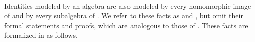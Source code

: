 \begin{code}
\AgdaSymbol{(}\AgdaSpace{}%
\AgdaSpace{}%
\AgdaSymbol{)}%
\>[70]\<%
\\
%
\>[6]\AgdaSpace{}%
\AgdaSpace{}%
%
\>[14]%
\>[32]%
\>[37]\<%
\\
\>[1][@{}l@{\AgdaIndent{0}}]%
\>[2]\<%
\\
%
\>[2]\AgdaSpace{}%
\AgdaSpace{}%
\AgdaSymbol{=}\AgdaSpace{}%
\AgdaSpace{}%
\AgdaSpace{}%
\AgdaSpace{}%
\AgdaSpace{}%
\AgdaSymbol{;}\AgdaSpace{}%
\AgdaSpace{}%
\AgdaSymbol{=}\AgdaSpace{}%
\AgdaSpace{}%
\AgdaSpace{}%
\AgdaSpace{}%
\<%
\\
%
\>[2]\AgdaSpace{}%
\AgdaSpace{}%
\AgdaSpace{}%
\AgdaSpace{}%
\AgdaSymbol{()}\AgdaSpace{}%
\AgdaSpace{}%
\AgdaSymbol{(}\AgdaSpace{}%
\AgdaSpace{}%
\AgdaSpace{}%
\AgdaSpace{}%
\AgdaSymbol{)}\AgdaSpace{}%
\AgdaSymbol{;}\AgdaSpace{}%
\AgdaSpace{}%
\AgdaSpace{}%
\AgdaSpace{}%
\AgdaSpace{}%
\AgdaSymbol{(}\AgdaSpace{}%
\AgdaSpace{}%
\AgdaSymbol{)}\<%
\\
%
\>[2]\AgdaSpace{}%
\AgdaSpace{}%
\AgdaOperator{\AgdaFunction{𝔻[}}\AgdaSpace{}%
\AgdaSpace{}%
\AgdaOperator{\AgdaFunction{]}}\<%
\\
\>[0]\<%
\end{code}
Identities modeled by an algebra  are also modeled by every homomorphic image of
 and by every subalgebra of .
\ifshort
We refer to these facts as  and , but omit their formal
statements and proofs, which are analogous to those of .
\else
These facts are formalized in \agda as follows.

